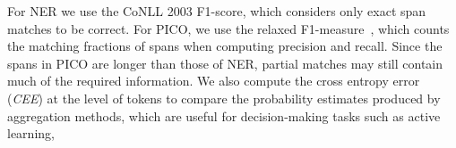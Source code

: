 For NER we use the CoNLL 2003 F1-score, which considers only exact span matches %
to be correct. 
For PICO, we use the relaxed F1-measure~\cite{nguyen2017aggregating}, which counts the matching fractions of spans when computing precision and recall.
Since the spans in PICO are longer than those of NER, partial matches may still contain much of the required information. 
We also compute the cross entropy error (\emph{CEE}) at the level of tokens
to compare the probability estimates produced by aggregation methods, which are useful for decision-making tasks such as active learning, 

